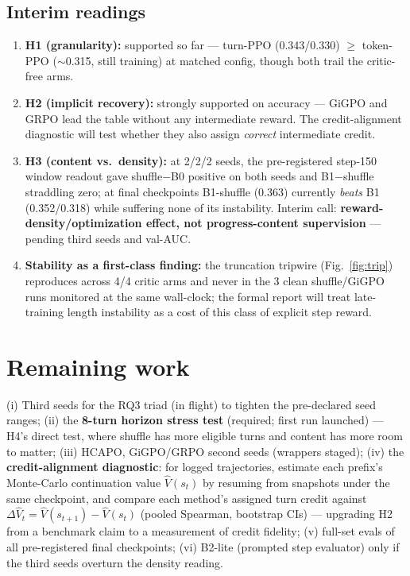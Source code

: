 \documentclass[11pt,a4paper]{article}
\begin{document}
\subsection{Interim readings}

\begin{enumerate}
  \item \textbf{H1 (granularity):} supported so far --- turn-PPO (0.343/0.330) $\geq$ token-PPO
  ($\sim$0.315, still training) at matched config, though both trail the critic-free arms.
  \item \textbf{H2 (implicit recovery):} strongly supported on accuracy --- GiGPO and GRPO lead
  the table without any intermediate reward. The credit-alignment diagnostic will test whether
  they also assign \emph{correct} intermediate credit.
  \item \textbf{H3 (content vs.\ density):} at 2/2/2 seeds, the pre-registered step-150 window
  readout gave shuffle$-$B0 positive on both seeds and B1$-$shuffle straddling zero; at final
  checkpoints B1-shuffle (0.363) currently \emph{beats} B1 (0.352/0.318) while suffering none
  of its instability. Interim call: \textbf{reward-density/optimization effect, not
  progress-content supervision} --- pending third seeds and val-AUC.
  \item \textbf{Stability as a first-class finding:} the truncation tripwire (Fig.~\ref{fig:trip})
  reproduces across 4/4 critic arms and never in the 3 clean shuffle/GiGPO runs monitored at the
  same wall-clock; the formal report will treat late-training length instability as a cost of
  this class of explicit step reward.
\end{enumerate}

\section{Remaining work}
\label{sec:remaining}

(i) Third seeds for the RQ3 triad (in flight) to tighten the pre-declared seed ranges;
(ii) the \textbf{8-turn horizon stress test} (required; first run launched) --- H4's direct
test, where shuffle has more eligible turns and content has more room to matter;
(iii) HCAPO, GiGPO/GRPO second seeds (wrappers staged);
(iv) the \textbf{credit-alignment diagnostic}: for logged trajectories, estimate each prefix's
Monte-Carlo continuation value $\hat V(s_t)$ by resuming from snapshots under the same
checkpoint, and compare each method's assigned turn credit against
$\Delta\hat V_t = \hat V(s_{t+1})-\hat V(s_t)$ (pooled Spearman, bootstrap CIs) --- upgrading
H2 from a benchmark claim to a measurement of credit fidelity;
(v) full-set evals of all pre-registered final checkpoints;
(vi) B2-lite (prompted step evaluator) only if the third seeds overturn the density reading.
\end{document}
